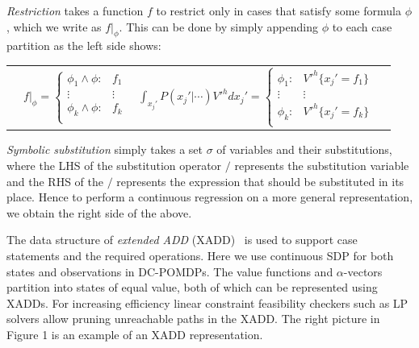 \documentclass{article} %
\begin{document}
\emph{Restriction} takes a function $f$ to restrict only in cases
that satisfy some formula $\phi$, which we write as $f|_{\phi}$.  
This can be done by simply appending $\phi$ to each case partition
as the left side shows:
{\footnotesize
\begin{center}
\begin{tabular}{r c c l}
&
\hspace{0mm}
  $f|_{\phi} = \begin{cases}
    \phi_1 \land \phi : & f_1 \\ 
   \vdots&\vdots\\ 
    \phi_k \land \phi : & f_k \\ 
  \end{cases}$
&
\hspace{15mm}
$\int_{x_j'} P(x_j'|\cdots) V'^{h} dx_j' = \begin{cases}
    \phi_1: & V'^{h} \{ x_j' = f_1 \} \\ 
   \vdots&\vdots\\ 
    \phi_k: & V'^{h} \{ x_j' = f_k \}  \\ 
  \end{cases}$
  \end{tabular}
\end{center}
}
\emph{Symbolic substitution} simply takes a set $\sigma$ of variables and their substitutions, where
the LHS of the substitution operator $/$ represents the substitution variable and the
RHS of the $/$ represents the expression that should be substituted in its place.
Hence to perform a continuous regression on a more general
representation, we obtain the right side of the above. 

The data structure of \emph{extended ADD} (XADD)~\cite{sanner_uai11} is used to support
case statements and the required operations.  Here we use continuous SDP for both states and observations in DC-POMDPs. The value functions and $\alpha$-vectors partition into states of equal value, both of which can be represented using XADDs. For increasing efficiency linear constraint feasibility checkers such as LP solvers allow pruning unreachable paths in the XADD. The right picture in Figure 1 is an example of an XADD representation. 
\end{document}

